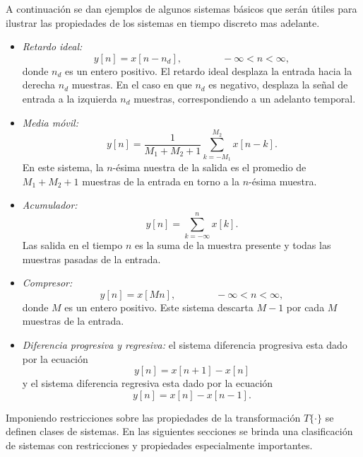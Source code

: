 \documentclass[a4paper]{report}
\begin{document}
A continuación se dan ejemplos de algunos sistemas básicos que serán útiles para ilustrar las propiedades de los sistemas en tiempo discreto mas adelante.
\begin{itemize}
 \item\emph{Retardo ideal:}
 \begin{equation}\label{eq:seq_and_sys_system_ideal_delay}
  y[n]=x[n-n_d],
  \qquad\qquad
  -\infty<n<\infty,  
 \end{equation}
 donde \(n_d\) es un entero positivo. El retardo ideal desplaza la entrada hacia la derecha \(n_d\) muestras. En el caso en que \(n_d\) es negativo, desplaza la señal de entrada a la izquierda \(n_d\) muestras, correspondiendo a un adelanto temporal.
 \item\emph{Media móvil:} 
 \begin{equation}\label{eq:seq_and_sys_system_moving_average}
  y[n]=\frac{1}{M_1+M_2+1}\sum_{k=-M_1}^{M_2}x[n-k].  
 \end{equation}
 En este sistema, la \(n\)-ésima nuestra de la salida es el promedio de \(M_1+M_2+1\) muestras de la entrada en torno a la \(n\)-ésima muestra.
 \item\emph{Acumulador:} 
 \begin{equation}\label{eq:seq_and_sys_system_accumulator}
  y[n]=\sum_{k=-\infty}^nx[k].   
 \end{equation}
 Las salida en el tiempo \(n\) es la suma de la muestra presente y todas las muestras pasadas de la entrada.
 \item\emph{Compresor:}
 \begin{equation}\label{eq:seq_and_sys_system_compressor}
  y[n]=x[Mn],
  \qquad\qquad 
  -\infty<n<\infty,  
 \end{equation}
 donde \(M\) es un entero positivo. Este sistema descarta \(M-1\) por cada \(M\) muestras de la entrada.
 \item\emph{Diferencia progresiva y regresiva:} el sistema diferencia progresiva esta dado por la ecuación
 \begin{equation}\label{eq:seq_and_sys_system_forward_difference}
  y[n]=x[n+1]-x[n]
 \end{equation}
 y el sistema diferencia regresiva esta dado por la ecuación
  \begin{equation}\label{eq:seq_and_sys_system_backward_difference}
  y[n]=x[n]-x[n-1].
 \end{equation}
\end{itemize}

Imponiendo restricciones sobre las propiedades de la transformación \(T\{\cdot\}\) se definen clases de sistemas. En las siguientes secciones se brinda una clasificación de sistemas con restricciones y propiedades especialmente importantes. 
\end{document}
